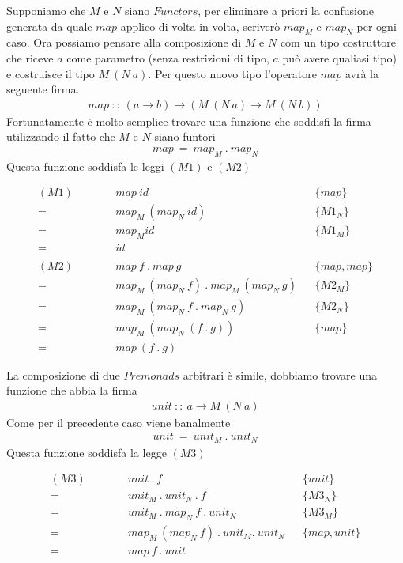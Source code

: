 Supponiamo che $M$ e $N$ siano $Functors$, per eliminare a priori la confusione
generata da quale $map$ applico di volta in volta, scriverò $map_M$ e $map_N$
per ogni caso.
Ora possiamo pensare alla composizione di $M$ e $N$ com un tipo costruttore che
riceve $a$ come parametro (senza restrizioni di tipo, $a$ può avere qualiasi
tipo) e costruisce il tipo $M\ (N\ a)$.
Per questo nuovo tipo l'operatore $map$ avrà la seguente firma.
\begin{align*}
  map\ ::\ (a \to b) \to (M\ (N\ a) \to M\ (N\ b))
\end{align*}
Fortunatamente è molto semplice trovare una funzione che soddisfi la firma
utilizzando il fatto che $M$ e $N$ siano funtori
\begin{align*}
  map\ =\ map_M\ .\ map_N
\end{align*}
Questa funzione soddisfa le leggi $(M1)$ e $(M2)$
\begin{framed}
  \begin{align*}
      (M1)\qquad
      &\quad map\ id && \{map\}\\
      =&\quad map_M\ (map_N\ id) && \{M1_N\}\\
      =&\quad map_M id && \{M1_M\}\\
      =&\quad id && \\\\
      (M2)\qquad
      &\quad map\ f\ .\ map\ g && \{map, map\}\\
      =&\quad map_M\ (map_N\ f)\ .\ map_M\ (map_N\ g) && \{M2_M\}\\
      =&\quad map_M\ (map_N\ f\ .\ map_N\ g) && \{M2_N\}\\
      =&\quad map_M\ (map_N\ (f\ .\ g)) && \{map\}\\
      =&\quad map\ (f\ .\ g)
  \end{align*}
\end{framed}
La composizione di due $Premonads$ arbitrari è simile, dobbiamo trovare una
funzione che abbia la firma
\begin{align*}
  unit\ ::\ a \to M\ (N\ a)
\end{align*}
Come per il precedente caso viene banalmente
\begin{align*}
  unit\ =\ unit_M\ .\ unit_N
\end{align*}
Questa funzione soddisfa la legge $(M3)$
\begin{framed}
  \begin{align*}
      (M3)\qquad
      &\quad unit\ .\ f && \{unit\}\\
      =&\quad unit_M\ .\ unit_N\ .\ f && \{M3_N\}\\
      =&\quad unit_M\ .\ map_N\ f\ .\ unit_N && \{M3_M\}\\
      =&\quad map_M\ (map_N\ f)\ .\ unit_M .\ unit_N && \{map, unit\}\\
      =&\quad map\ f\ .\ unit
  \end{align*}
\end{framed}
